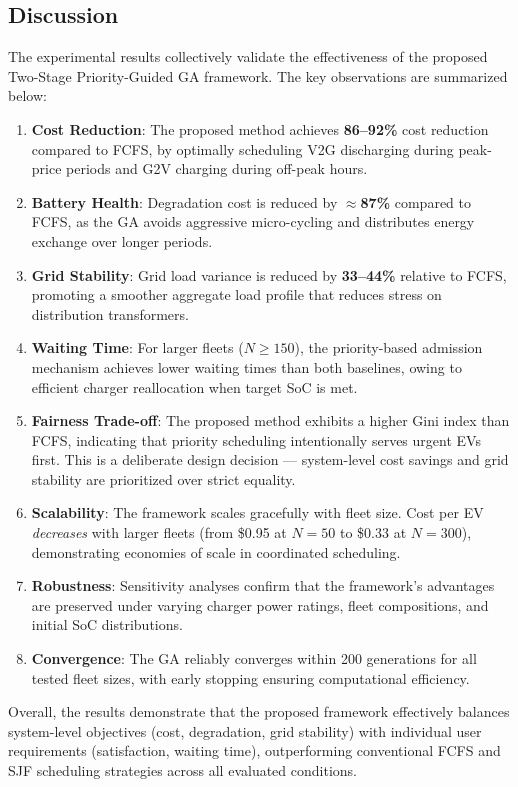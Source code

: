 \subsection{Discussion}

\noindent The experimental results collectively validate the effectiveness of the proposed Two-Stage Priority-Guided GA framework. The key observations are summarized below:

\begin{enumerate}
    \item \textbf{Cost Reduction}: The proposed method achieves \textbf{86--92\%} cost reduction compared to FCFS, by optimally scheduling V2G discharging during peak-price periods and G2V charging during off-peak hours.

    \item \textbf{Battery Health}: Degradation cost is reduced by \textbf{$\approx$87\%} compared to FCFS, as the GA avoids aggressive micro-cycling and distributes energy exchange over longer periods.

    \item \textbf{Grid Stability}: Grid load variance is reduced by \textbf{33--44\%} relative to FCFS, promoting a smoother aggregate load profile that reduces stress on distribution transformers.

    \item \textbf{Waiting Time}: For larger fleets ($N \geq 150$), the priority-based admission mechanism achieves lower waiting times than both baselines, owing to efficient charger reallocation when target SoC is met.

    \item \textbf{Fairness Trade-off}: The proposed method exhibits a higher Gini index than FCFS, indicating that priority scheduling intentionally serves urgent EVs first. This is a deliberate design decision --- system-level cost savings and grid stability are prioritized over strict equality.

    \item \textbf{Scalability}: The framework scales gracefully with fleet size. Cost per EV \textit{decreases} with larger fleets (from \$0.95 at $N=50$ to \$0.33 at $N=300$), demonstrating economies of scale in coordinated scheduling.

    \item \textbf{Robustness}: Sensitivity analyses confirm that the framework's advantages are preserved under varying charger power ratings, fleet compositions, and initial SoC distributions.

    \item \textbf{Convergence}: The GA reliably converges within 200 generations for all tested fleet sizes, with early stopping ensuring computational efficiency.
\end{enumerate}

\noindent Overall, the results demonstrate that the proposed framework effectively balances system-level objectives (cost, degradation, grid stability) with individual user requirements (satisfaction, waiting time), outperforming conventional FCFS and SJF scheduling strategies across all evaluated conditions.
